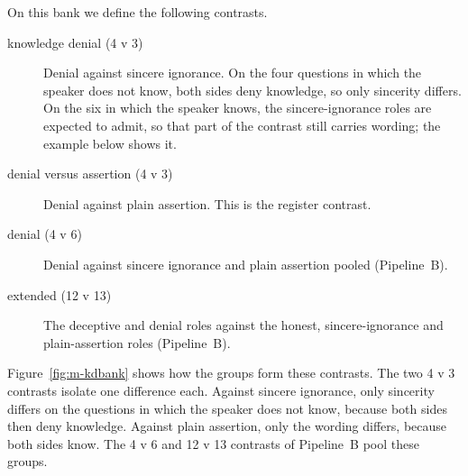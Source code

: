 On this bank we define the following contrasts.
\begin{description}
\item[knowledge denial (4 v 3)] Denial against sincere ignorance. On the four questions in which the speaker does not know, both sides deny knowledge, so only sincerity differs. %
On the six in which the speaker knows, the sincere-ignorance roles are expected to admit, so that part of the contrast still carries wording; the example below shows it. %
\item[denial versus assertion (4 v 3)] Denial against plain assertion. This is the register contrast. %
\item[denial (4 v 6)] Denial against sincere ignorance and plain assertion pooled (Pipeline~B). %
\item[extended (12 v 13)] The deceptive and denial roles against the honest, sincere-ignorance and plain-assertion roles (Pipeline~B). %
\end{description}

Figure~\ref{fig:m-kdbank} shows how the groups form these contrasts. The two 4 v 3 contrasts isolate one difference each. Against sincere ignorance, only sincerity differs on the questions in which the speaker does not know, because both sides then deny knowledge. Against plain assertion, only the wording differs, because both sides know. The 4 v 6 and 12 v 13 contrasts of Pipeline~B pool these groups.

